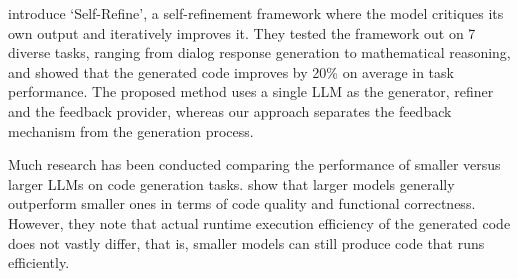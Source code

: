 \citet{Madaan2023SelfRefine} introduce `Self-Refine', a self-refinement framework where the model critiques its own output and iteratively improves it. They tested the framework out on 7 diverse tasks, ranging from dialog response generation to mathematical reasoning, and showed that the generated code improves by 20\% on average in task performance. The proposed method uses a single LLM as the generator, refiner and the feedback provider, whereas our approach separates the feedback mechanism from the generation process.




Much research has been conducted comparing the performance of smaller versus larger LLMs on code generation tasks. \citet{Coignion2024Performance} show that larger models generally outperform smaller ones in terms of code quality and functional correctness. However, they note that actual runtime execution efficiency of the generated code does not vastly differ, that is, smaller models can still produce code that runs efficiently.




